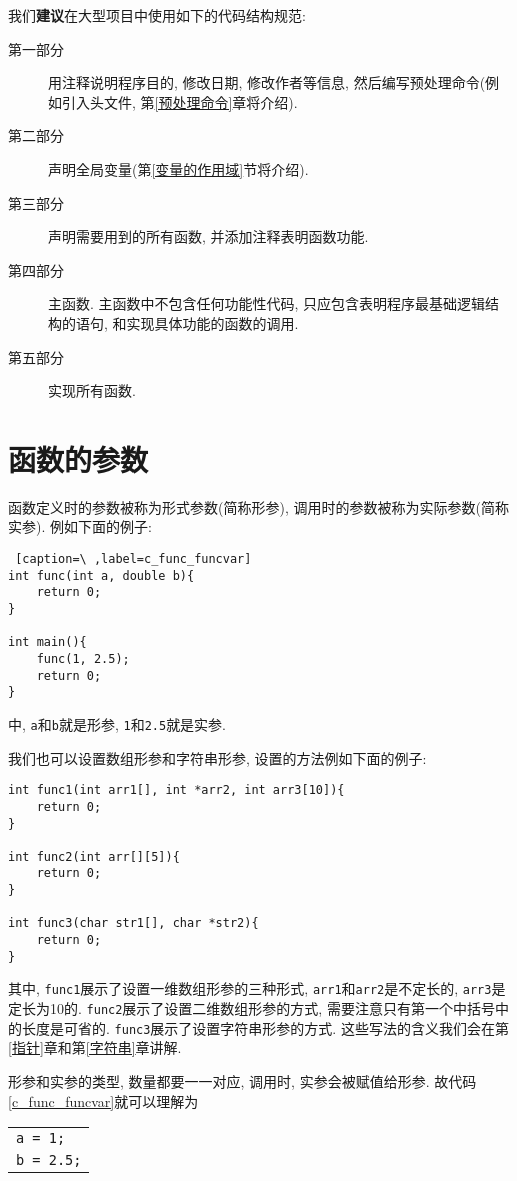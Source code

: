         我们\textbf{建议}在大型项目中使用如下的代码结构规范:
        \begin{description}
            \item[第一部分] 用注释说明程序目的, 修改日期, 修改作者等信息, 然后编写预处理命令(例如引入头文件, 第\ref{预处理命令}章将介绍).
            \item[第二部分] 声明全局变量(第\ref{变量的作用域}节将介绍).
            \item[第三部分] 声明需要用到的所有函数, 并添加注释表明函数功能.
            \item[第四部分] 主函数. 主函数中不包含任何功能性代码, 只应包含表明程序最基础逻辑结构的语句, 和实现具体功能的函数的调用. 
            \item[第五部分] 实现所有函数. 
        \end{description}

    \section{函数的参数}
        函数定义时的参数被称为形式参数(简称形参), 调用时的参数被称为实际参数(简称实参). 例如下面的例子:
\begin{lstlisting} [caption=\ ,label=c_func_funcvar]
int func(int a, double b){
    return 0;
}

int main(){
    func(1, 2.5);
    return 0;
}
\end{lstlisting}
        中, \texttt{a}和\texttt{b}就是形参, \texttt{1}和\texttt{2.5}就是实参.

        我们也可以设置数组形参和字符串形参, 设置的方法例如下面的例子:
\begin{lstlisting}
int func1(int arr1[], int *arr2, int arr3[10]){
    return 0;
}

int func2(int arr[][5]){
    return 0;
}

int func3(char str1[], char *str2){
    return 0;
}
\end{lstlisting}

        其中, \texttt{func1}展示了设置一维数组形参的三种形式, \texttt{arr1}和\texttt{arr2}是不定长的, \texttt{arr3}是定长为10的. \texttt{func2}展示了设置二维数组形参的方式, 需要注意只有第一个中括号中的长度是可省的. \texttt{func3}展示了设置字符串形参的方式. 这些写法的含义我们会在第\ref{指针}章和第\ref{字符串}章讲解.

        形参和实参的类型, 数量都要一一对应, 调用时, 实参会被赋值给形参. 故代码\ref{c_func_funcvar}就可以理解为
        \begin{center}
        \begin{longtable}{l}
            \texttt{a = 1;} \\
            \texttt{b = 2.5;}
        \end{longtable}
        \end{center}


